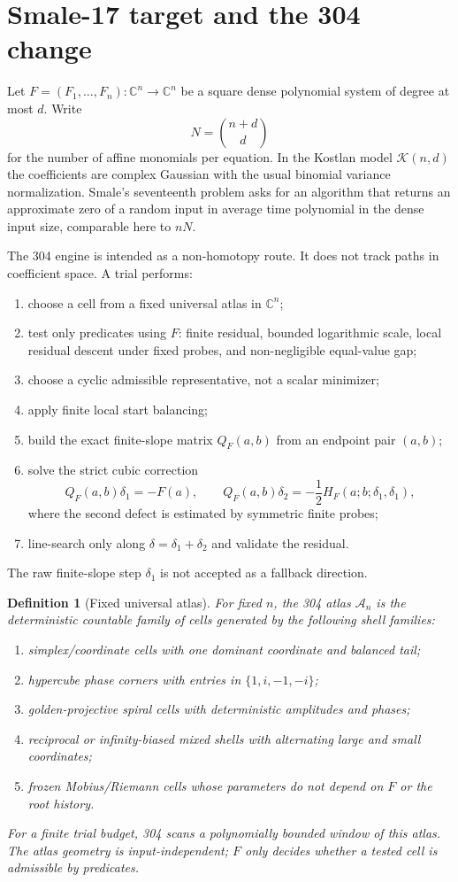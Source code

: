 \documentclass[11pt]{article}
\newtheorem{definition}{Definition}[section]
\newcommand{\C}{\mathbb C}
\newcommand{\K}{\mathcal K}
\newcommand{\A}{\mathcal A}
\begin{document}
\section{Smale-17 target and the 304 change}

Let $F=(F_1,\ldots,F_n):\C^n\to\C^n$ be a square dense polynomial system of degree at most $d$.  Write
\[
        N=\binom{n+d}{d}
\]
for the number of affine monomials per equation.  In the Kostlan model $\K(n,d)$ the coefficients are complex Gaussian with the usual binomial variance normalization.  Smale's seventeenth problem asks for an algorithm that returns an approximate zero of a random input in average time polynomial in the dense input size, comparable here to $nN$.

The 304 engine is intended as a non-homotopy route.  It does not track paths in coefficient space.  A trial performs:
\begin{enumerate}[label=(\roman*)]
\item choose a cell from a fixed universal atlas in $\C^n$;
\item test only predicates using $F$: finite residual, bounded logarithmic scale, local residual descent under fixed probes, and non-negligible equal-value gap;
\item choose a cyclic admissible representative, not a scalar minimizer;
\item apply finite local start balancing;
\item build the exact finite-slope matrix $Q_F(a,b)$ from an endpoint pair $(a,b)$;
\item solve the strict cubic correction
\[
        Q_F(a,b)\delta_1=-F(a),\qquad
        Q_F(a,b)\delta_2=-\frac12H_F(a;b;\delta_1,\delta_1),
\]
where the second defect is estimated by symmetric finite probes;
\item line-search only along $\delta=\delta_1+\delta_2$ and validate the residual.
\end{enumerate}
The raw finite-slope step $\delta_1$ is not accepted as a fallback direction.

\begin{definition}[Fixed universal atlas]
For fixed $n$, the 304 atlas $\A_n$ is the deterministic countable family of cells generated by the following shell families:
\begin{enumerate}[label=(\alph*)]
\item simplex/coordinate cells with one dominant coordinate and balanced tail;
\item hypercube phase corners with entries in $\{1,i,-1,-i\}$;
\item golden-projective spiral cells with deterministic amplitudes and phases;
\item reciprocal or infinity-biased mixed shells with alternating large and small coordinates;
\item frozen Mobius/Riemann cells whose parameters do not depend on $F$ or the root history.
\end{enumerate}
For a finite trial budget, 304 scans a polynomially bounded window of this atlas.  The atlas geometry is input-independent; $F$ only decides whether a tested cell is admissible by predicates.
\end{definition}
\end{document}
